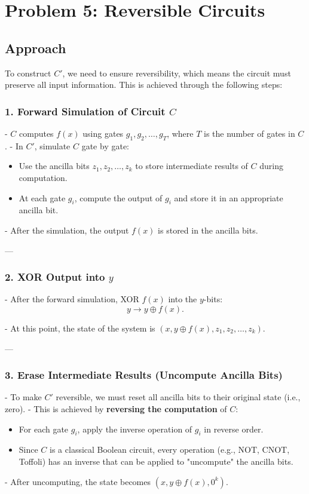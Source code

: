 \documentclass[12pt,letterpaper]{article}
\begin{document}
\section*{Problem 5: Reversible Circuits}



\subsection*{Approach}

To construct \( C' \), we need to ensure reversibility, which means the circuit must preserve all input information. This is achieved through the following steps:

\subsubsection*{1. Forward Simulation of Circuit \( C \)}

- \( C \) computes \( f(x) \) using gates \( g_1, g_2, \dots, g_T \), where \( T \) is the number of gates in \( C \).
- In \( C' \), simulate \( C \) gate by gate:
  \begin{itemize}
      \item Use the ancilla bits \( z_1, z_2, \dots, z_k \) to store intermediate results of \( C \) during computation.
      \item At each gate \( g_i \), compute the output of \( g_i \) and store it in an appropriate ancilla bit.
  \end{itemize}
- After the simulation, the output \( f(x) \) is stored in the ancilla bits.

---

\subsubsection*{2. XOR Output into \( y \)}

- After the forward simulation, XOR \( f(x) \) into the \( y \)-bits:
  \[
  y \to y \oplus f(x).
  \]

- At this point, the state of the system is \( (x, y \oplus f(x), z_1, z_2, \dots, z_k) \).

---

\subsubsection*{3. Erase Intermediate Results (Uncompute Ancilla Bits)}

- To make \( C' \) reversible, we must reset all ancilla bits to their original state (i.e., zero).
- This is achieved by \textbf{reversing the computation} of \( C \):
  \begin{itemize}
      \item For each gate \( g_i \), apply the inverse operation of \( g_i \) in reverse order.
      \item Since \( C \) is a classical Boolean circuit, every operation (e.g., NOT, CNOT, Toffoli) has an inverse that can be applied to "uncompute" the ancilla bits.
  \end{itemize}
- After uncomputing, the state becomes \( (x, y \oplus f(x), 0^k) \).
\end{document}
